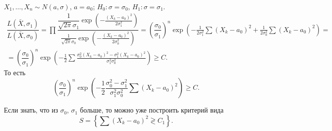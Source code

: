 



  

\begin{ex}
  $X_1,\dots,X_n \sim N(a, \sigma)$, $a = a_0$;
  $H_0 : \sigma = \sigma_0$,
  $H_1 : \sigma = \sigma_1$.
  \begin{multline*}
    \dfrac{L(\bar X, \sigma_1)}{L(\bar X, \sigma_0)}
    = \prod \dfrac{\dfrac{1}{\sqrt{2\pi} \sigma_1} \exp\left(- \frac{(X_k -
    a_0)^2}{2\sigma_1^2}\right)}{\frac{1}{\sqrt{2\pi} \sigma_0} \exp\left(- \frac{(X_k - a_0)^2}{2\sigma_0^2}\right)}
    = \left(\dfrac{\sigma_0}{\sigma_1}\right)^n \exp\left(-\frac{1}{2\sigma_1^2}
    \sum (X_k-a_0)^2 + \frac{1}{2\sigma_0^2} \sum (X_k-a_0)^2 \right) = \\
    = \left(\dfrac{\sigma_0}{\sigma_1}\right)^n \exp\left( -\frac{1}{2} \sum
    \frac{\sigma_0^2 (X_k-a_0)^2 - \sigma_1^2 (X_k - a_0)^2}{\sigma_1^2
  \sigma_0^2} \right) \geqslant C.
  \end{multline*}
То есть
  \begin{equation*}
    \left(\dfrac{\sigma_0}{\sigma_1}\right)^n \exp\left(-\dfrac{1}{2}
    \dfrac{\sigma_0^2 - \sigma_1^2}{\sigma_1^2 \sigma_0^2} \sum
  (X_k-a_0)^2\right) \geqslant C.
  \end{equation*}

  Если знать, что из $ \sigma_0 $, $ \sigma_1 $ больше, то можно уже построить
  критерий вида
  $$ S = \left\{ \sum(X_k-a_0)^2 \gtrless C_1 \right\}. $$
\end{ex}

